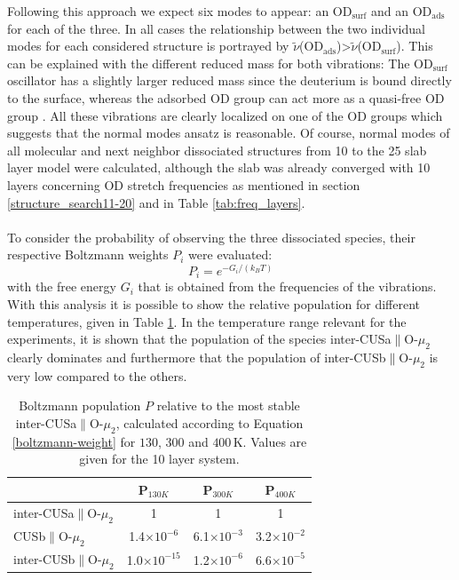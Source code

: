\documentclass[11pt,DIV=13,BCOR=5mm,a4paper,headinclude]{scrbook}
\begin{document}
 Following this approach we expect six modes to appear: an OD$_\textrm{surf}$ and an OD$_\textrm{ads}$ for each of the three.
In all cases the relationship between the two individual modes for each considered structure is portrayed by $\tilde{\nu}$(OD$_\textrm{ads}$)>$\tilde{\nu}$(OD$_\textrm{surf}$).
This can be explained with the different reduced mass for both vibrations: The OD$_\textrm{surf}$ oscillator has a slightly larger reduced mass since the deuterium is bound directly to the surface, whereas the adsorbed OD group can act more as a quasi-free OD group \cite{Wirth2014}.
All these vibrations are clearly localized on one of the OD groups which suggests that the normal modes ansatz is reasonable.
Of course, normal modes of all molecular and next neighbor dissociated structures from 10 to the 25 slab layer model were calculated, although the slab was already converged with 10 layers concerning OD stretch frequencies as mentioned in section \ref{structure_search11-20} and in Table \ref{tab:freq_layers}. 
\\
\\

To consider the probability of observing the three dissociated species, their respective Boltzmann weights $P_i$ were evaluated:
\begin{equation}\label{boltzmann-weight}
 P_i=e^{-G_i/(k_BT)}
\end{equation}
with the free energy $G_i$ that is obtained from the frequencies of the vibrations.
With this analysis it is possible to show the relative population for different temperatures, given in Table \ref{tab:boltzmann-pop}.
In the temperature range relevant for the experiments, it is shown that the population of the species inter-CUSa$\parallel$O-$\mu_2$ clearly dominates and furthermore that the population of inter-CUSb$\parallel$O-$\mu_2$ is very low compared to the others.
\begin{table}[th]
  \centering
 \caption{Boltzmann population $P$ relative to the most stable inter-CUSa$\parallel$O-$\mu_2$, calculated according to Equation \ref{boltzmann-weight} for $130$, $300$ and $400\,$K.
Values are given for the 10 layer system.}
\vspace*{.2cm} 
 \begin{tabular}{l|ccc}
 \toprule
  & P$_{130K}$ & P$_{300K}$ & P$_{400K}$\\\midrule
  inter-CUSa$\parallel$O-$\mu_2$ &1 &1 &1 \\
  CUSb$\parallel$O-$\mu_2$ & 1.4$\times 10^{-6}$& 6.1$\times 10^{-3}$& 3.2$\times 10^{-2}$\\
  inter-CUSb$\parallel$O-$\mu_2$ & 1.0$\times 10^{-15}$ & 1.2$\times 10^{-6}$ & 6.6$\times 10^{-5}$\\\bottomrule
  \end{tabular} 
  \label{tab:boltzmann-pop}
\end{table}
\end{document}
